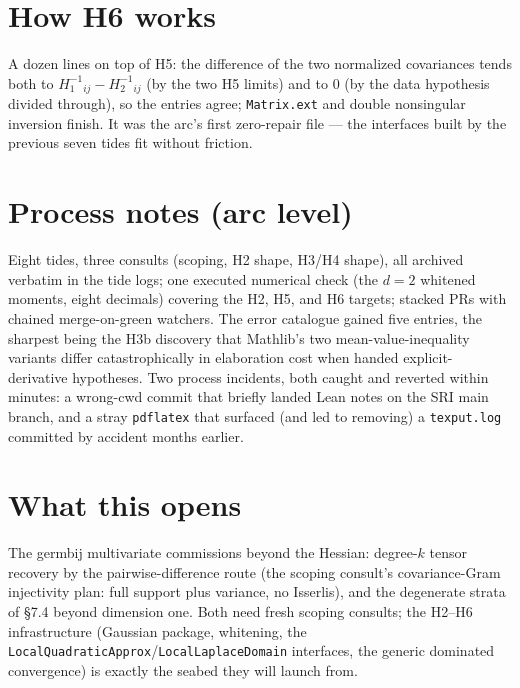 \documentclass[11pt]{article}
\begin{document}
\section{How H6 works}

A dozen lines on top of H5: the difference of the two normalized
covariances tends both to $H_1^{-1}{}_{ij} - H_2^{-1}{}_{ij}$ (by the
two H5 limits) and to $0$ (by the data hypothesis divided through),
so the entries agree; \texttt{Matrix.ext} and double nonsingular
inversion finish. It was the arc's first zero-repair file --- the
interfaces built by the previous seven tides fit without friction.

\section{Process notes (arc level)}

Eight tides, three consults (scoping, H2 shape, H3/H4 shape), all
archived verbatim in the tide logs; one executed numerical check
(the $d = 2$ whitened moments, eight decimals) covering the H2, H5,
and H6 targets; stacked PRs with chained merge-on-green watchers.
The error catalogue gained five entries, the sharpest being the
H3b discovery that Mathlib's two mean-value-inequality variants
differ catastrophically in elaboration cost when handed
explicit-derivative hypotheses. Two process incidents, both caught
and reverted within minutes: a wrong-cwd commit that briefly landed
Lean notes on the SRI main branch, and a stray \texttt{pdflatex}
that surfaced (and led to removing) a \texttt{texput.log} committed
by accident months earlier.

\section{What this opens}

The germbij multivariate commissions beyond the Hessian: degree-$k$
tensor recovery by the pairwise-difference route (the scoping
consult's covariance-Gram injectivity plan: full support plus
variance, no Isserlis), and the degenerate strata of \S7.4 beyond
dimension one. Both need fresh scoping consults; the H2--H6
infrastructure (Gaussian package, whitening, the
\texttt{LocalQuadraticApprox}/\texttt{LocalLaplaceDomain}
interfaces, the generic dominated convergence) is exactly the seabed
they will launch from.
\end{document}
